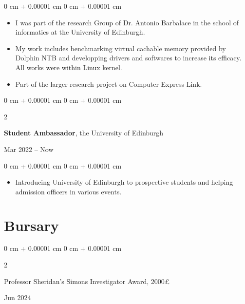 \documentclass[10pt, letterpaper]{article}
\newenvironment{highlights}{
    \begin{itemize}[
        topsep=0.10 cm,
        parsep=0.10 cm,
        partopsep=0pt,
        itemsep=0pt,
        leftmargin=0 cm + 10pt
    ]
}{
    \end{itemize}
} %
\newenvironment{onecolentry}{
    \begin{adjustwidth}{
        0 cm + 0.00001 cm
    }{
        0 cm + 0.00001 cm
    }
}{
    \end{adjustwidth}
} %
\newenvironment{twocolentry}[2][]{
    \onecolentry
    \def\secondColumn{#2}
    \setcolumnwidth{\fill, 4.5 cm}
    \begin{paracol}{2}
}{
    \switchcolumn \raggedleft \secondColumn
    \end{paracol}
    \endonecolentry
} %
\begin{document}
        \vspace{0.10 cm}
        \begin{onecolentry}
            \begin{highlights}
                \item I was part of the research Group of Dr. Antonio Barbalace in the school of informatics at the University of Edinburgh.
				\item My work includes benchmarking virtual cachable memory provided by Dolphin NTB and developping drivers and softwares to increase its efficacy.
				All works were within Linux kernel.
				\item Part of the larger research project on Computer Express Link.
            \end{highlights}
        \end{onecolentry}

        \vspace{0.2 cm}
        \begin{twocolentry}{
            Mar 2022 – Now
        }
            \textbf{Student Ambassador}, the University of Edinburgh
		\end{twocolentry}
        \vspace{0.10 cm}
        \begin{onecolentry}
            \begin{highlights}
				\item Introducing University of Edinburgh to prospective students and helping admission officers in various events.
            \end{highlights}
        \end{onecolentry}

    
    \section{Bursary}
        
        \begin{samepage}
            \begin{twocolentry}{
                Jun 2024
            }
                Professor Sheridan's Simons Investigator Award, 2000£
            \end{twocolentry}

        \end{samepage}
\end{document}
